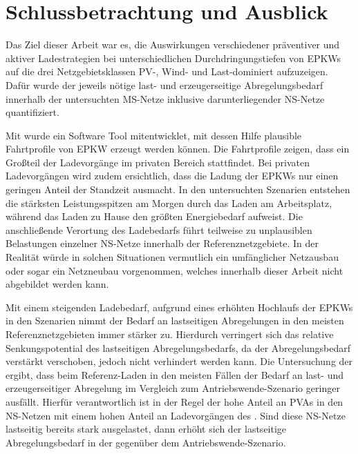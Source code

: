 \section{Schlussbetrachtung und Ausblick}\label{chap:schlussbetrachtung}

Das Ziel dieser Arbeit war es, die Auswirkungen verschiedener präventiver und aktiver Ladestrategien bei unterschiedlichen Durchdringungstiefen von \glspl{EPKW} auf die drei Netzgebietsklassen \gls{PV}-, Wind- und Last-dominiert aufzuzeigen.
Dafür wurde der jeweils nötige last- und erzeugerseitige Abregelungsbedarf innerhalb der untersuchten \gls{MS}-Netze inklusive darunterliegender \gls{NS}-Netze quantifiziert.\medskip

Mit  wurde ein Software Tool mitentwicklet, mit dessen Hilfe plausible Fahrtprofile von \gls{EPKW} erzeugt werden können.
Die Fahrtprofile zeigen, dass ein Großteil der Ladevorgänge im privaten Bereich stattfindet.
Bei privaten Ladevorgängen wird zudem ersichtlich, dass die Ladung der \glspl{EPKW} nur einen geringen Anteil der Standzeit ausmacht.
In den untersuchten Szenarien entstehen die stärksten Leistungsspitzen am Morgen durch das Laden am Arbeitsplatz, während das Laden zu Hause den größten Energiebedarf aufweist.
Die anschließende Verortung des Ladebedarfs führt teilweise zu unplausiblen Belastungen einzelner \gls{NS}-Netze innerhalb der Referenznetzgebiete.
In der Realität würde in solchen Situationen vermutlich ein umfänglicher Netzausbau oder sogar ein Netzneubau vorgenommen, welches innerhalb dieser Arbeit nicht abgebildet werden kann.\medskip

Mit einem steigenden Ladebedarf, aufgrund eines erhöhten Hochlaufs der \glspl{EPKW} in den Szenarien nimmt der Bedarf an lastseitigen Abregelungen in den meisten Referenznetzgebieten immer stärker zu.
Hierdurch verringert sich das relative Senkungspotential des lastseitigen Abregelungsbedarfs, da der Abregelungsbedarf verstärkt verschoben, jedoch nicht verhindert werden kann.
Die Untersuchung der \SzeFirmenparkplatz ergibt, dass beim Referenz-Laden in den meisten Fällen der Bedarf an last- und erzeugerseitiger Abregelung im Vergleich zum Antriebswende-Szenario geringer ausfällt.
Hierfür verantwortlich ist in der Regel der hohe Anteil an \glspl{PVA} in den \gls{NS}-Netzen mit einem hohen Anteil an Ladevorgängen des \UC \zHdot.
Sind diese \gls{NS}-Netze lastseitig bereits stark ausgelastet, dann erhöht sich der lastseitige Abregelungsbedarf in der \SzeFirmenparkplatz gegenüber dem Antriebswende-Szenario.\medskip

